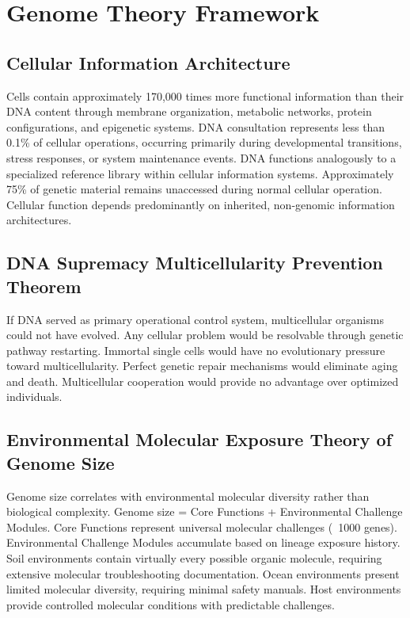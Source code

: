 \documentclass[12pt,a4paper]{article}
\begin{document}
\section{Genome Theory Framework}

\subsection{Cellular Information Architecture}

Cells contain approximately 170,000 times more functional information than their DNA content through membrane organization, metabolic networks, protein configurations, and epigenetic systems. DNA consultation represents less than 0.1\% of cellular operations, occurring primarily during developmental transitions, stress responses, or system maintenance events. DNA functions analogously to a specialized reference library within cellular information systems. Approximately 75\% of genetic material remains unaccessed during normal cellular operation. Cellular function depends predominantly on inherited, non-genomic information architectures.

\subsection{DNA Supremacy Multicellularity Prevention Theorem}

If DNA served as primary operational control system, multicellular organisms could not have evolved. Any cellular problem would be resolvable through genetic pathway restarting. Immortal single cells would have no evolutionary pressure toward multicellularity. Perfect genetic repair mechanisms would eliminate aging and death. Multicellular cooperation would provide no advantage over optimized individuals.

\subsection{Environmental Molecular Exposure Theory of Genome Size}

Genome size correlates with environmental molecular diversity rather than biological complexity. Genome size = Core Functions + Environmental Challenge Modules. Core Functions represent universal molecular challenges (~1000 genes). Environmental Challenge Modules accumulate based on lineage exposure history. Soil environments contain virtually every possible organic molecule, requiring extensive molecular troubleshooting documentation. Ocean environments present limited molecular diversity, requiring minimal safety manuals. Host environments provide controlled molecular conditions with predictable challenges.
\end{document}
